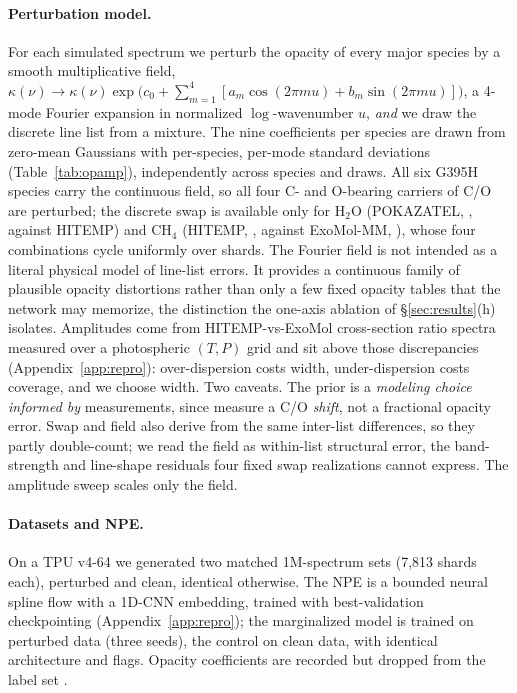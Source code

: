 \documentclass{article}
\begin{document}
\paragraph{Perturbation model.}
For each simulated spectrum we perturb the opacity of every major species by a
smooth multiplicative field,
$\kappa(\nu)\!\to\!\kappa(\nu)\exp\!\big(c_0+\sum_{m=1}^{4}
[a_m\cos(2\pi m u)+b_m\sin(2\pi m u)]\big)$, a 4-mode Fourier expansion in
normalized $\log$-wavenumber $u$, \emph{and} we draw the discrete line list from
a mixture. The nine coefficients per species are drawn from zero-mean Gaussians
with per-species, per-mode standard deviations (Table~\ref{tab:opamp}),
independently across species and draws. All six G395H species carry the continuous field, so all four C- and O-bearing
carriers of C/O are perturbed; the discrete swap is available only for H$_2$O (POKAZATEL,
\citealt{polyansky2018}, against HITEMP) and CH$_4$ (HITEMP,
\citealt{hargreaves2020}, against ExoMol-MM, \citealt{yurchenko2024}), whose four
combinations cycle uniformly over shards. The Fourier field is not intended as a
literal physical model of line-list errors. It provides a continuous family of
plausible opacity distortions rather than only a few fixed opacity tables that the
network may memorize, the distinction the one-axis ablation of
\S\ref{sec:results}(h) isolates. Amplitudes come from
HITEMP-vs-ExoMol cross-section ratio spectra measured over a photospheric
$(T,P)$ grid and sit above those discrepancies (Appendix~\ref{app:repro}):
over-dispersion costs width, under-dispersion costs coverage, and we choose
width. Two caveats. The prior is a \emph{modeling
choice informed by}
measurements, since \citet{yama2026} measure a C/O \emph{shift}, not a
fractional opacity error. Swap and field also derive from the same inter-list
differences, so they partly double-count; we read the field as within-list
structural error, the band-strength and line-shape residuals four fixed swap
realizations cannot express. The amplitude sweep scales only the field.

\paragraph{Datasets and NPE.}
On a TPU v4-64 we generated two matched 1M-spectrum sets (7{,}813 shards each),
perturbed and clean, identical otherwise. The NPE is a bounded neural spline flow
with a 1D-CNN embedding, trained with best-validation checkpointing
(Appendix~\ref{app:repro}); the marginalized model is trained on perturbed data
(three seeds), the control on clean data, with identical architecture and flags.
Opacity coefficients are recorded but dropped from the label set
\citep{alsing2019}.
\end{document}
